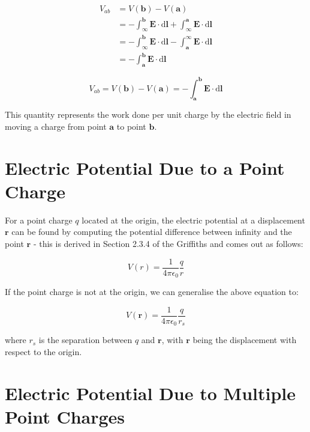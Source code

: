 \documentclass[
  letterpaper,
  DIV=11,
  numbers=noendperiod]{scrreprt}
\begin{document}
\[
\begin{split} 
V_{ab} & = V(\mathrm{\mathbf{b}}) − V(\mathrm{\mathbf{a}}) \\
& = -\int_{\infty}^{\mathrm{\mathbf{b}}} \mathrm{\mathbf{E}}\cdot \mathrm{d} \mathrm{\mathbf{l}}+ \int_{\infty}^{\mathrm{\mathbf{a}}} \mathrm{\mathbf{E}}\cdot \mathrm{d} \mathrm{\mathbf{l}}\\
& = -\int_{\infty}^{\mathrm{\mathbf{b}}} \mathrm{\mathbf{E}}\cdot \mathrm{d} \mathrm{\mathbf{l}}- \int_{\mathrm{\mathbf{a}}}^{\infty} \mathrm{\mathbf{E}}\cdot \mathrm{d} \mathrm{\mathbf{l}}\\
& = -\int_{\mathrm{\mathbf{a}}}^{\mathrm{\mathbf{b}}} \mathrm{\mathbf{E}}\cdot \mathrm{d} \mathrm{\mathbf{l}}
\end{split}
\]

\[ V_{ab} = V(\mathrm{\mathbf{b}}) − V(\mathrm{\mathbf{a}}) = -\int_{\mathrm{\mathbf{a}}}^{\mathrm{\mathbf{b}}} \mathrm{\mathbf{E}}\cdot \mathrm{d} \mathrm{\mathbf{l}}\]

This quantity represents the work done per unit charge by the electric
field in moving a charge from point \(\mathrm{\mathbf{a}}\) to point
\(\mathrm{\mathbf{b}}\).

\section{Electric Potential Due to a Point
Charge}\label{electric-potential-due-to-a-point-charge}

For a point charge \(q\) located at the origin, the electric potential
at a displacement \(\mathrm{\mathbf{r}}\) can be found by computing the
potential difference between infinity and the point
\(\mathrm{\mathbf{r}}\) - this is derived in Section 2.3.4 of the
Griffiths and comes out as follows:

\[ V(r) = \frac{1}{4\pi\epsilon_0} \frac{q}{r} \]

If the point charge is not at the origin, we can generalise the above
equation to:

\[ V(\mathrm{\mathbf{r}}) = \frac{1}{4\pi\epsilon_0} \frac{q}{r_s} \]

where \(r_s\) is the separation between \(q\) and
\(\mathrm{\mathbf{r}}\), with \(\mathrm{\mathbf{r}}\) being the
displacement with respect to the origin.

\section{Electric Potential Due to Multiple Point
Charges}\label{electric-potential-due-to-multiple-point-charges}
\end{document}
